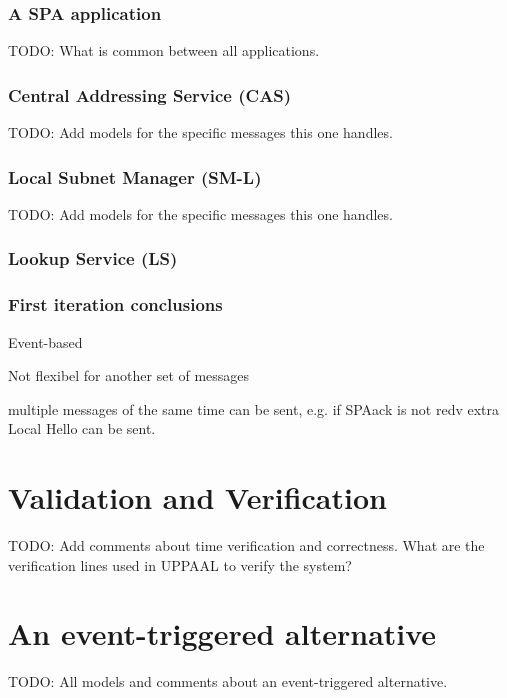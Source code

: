 
\subsubsection{A SPA application}
TODO: What is common between all applications.

\subsubsection{Central Addressing Service (CAS)}
TODO: Add models for the specific messages this one handles.

\subsubsection{Local Subnet Manager (SM-L)}
TODO: Add models for the specific messages this one handles.

\subsubsection{Lookup Service (LS)}

\subsubsection{First iteration conclusions}
Event-based

Not flexibel for another set of messages

multiple messages of the same time can be sent, e.g. if SPAack is not redv
extra Local Hello can be sent.

\section{Validation and Verification}
TODO: Add comments about time verification and correctness. What are the
verification lines used in UPPAAL to verify the system?

\section{An event-triggered alternative}
TODO: All models and comments about an event-triggered alternative.
